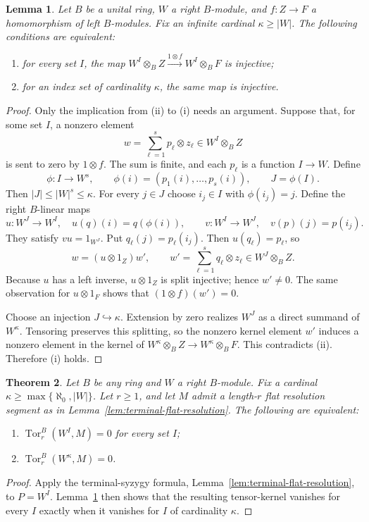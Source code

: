 \documentclass[11pt]{article}
\numberwithin{equation}{section}
\newtheorem{theorem}{Theorem}[section]
\newtheorem{lemma}[theorem]{Lemma}
\theoremstyle{definition}
\theoremstyle{remark}
\newcommand{\Tor}{\operatorname{Tor}}
\begin{document}
\begin{lemma}
\label{lem:coordinate-detection}
Let $B$ be a unital ring, $W$ a right $B$-module, and
$f:Z\to F$ a homomorphism of left $B$-modules.
Fix an infinite cardinal $\kappa\ge |W|$.  The following conditions
are equivalent:
\begin{enumerate}[label=(\roman*)]
\item for every set $I$, the map
$W^I\otimes_B Z\xrightarrow{1\otimes f}W^I\otimes_B F$
is injective;
\item for an index set of cardinality $\kappa$, the same map is injective.
\end{enumerate}
\end{lemma}
\begin{proof}
Only the implication from (ii) to (i) needs an argument.
Suppose that, for some set $I$, a nonzero element
\[
 w=\sum_{\ell=1}^{s}p_\ell\otimes z_\ell
 \in W^I\otimes_B Z
\]
is sent to zero by $1\otimes f$.  The sum is finite, and each
$p_\ell$ is a function $I\to W$.  Define
\[
\phi:I\to W^s,\qquad
\phi(i)=(p_1(i),\ldots,p_s(i)),\qquad
J=\phi(I).
\]
Then $|J|\le |W|^s\le\kappa$.  For every $j\in J$ choose
$i_j\in I$ with $\phi(i_j)=j$.  Define the right $B$-linear maps
\[
 u:W^J\to W^I,\quad u(q)(i)=q(\phi(i)),
 \qquad
 v:W^I\to W^J,\quad v(p)(j)=p(i_j).
\]
They satisfy $vu=1_{W^J}$.  Put $q_\ell(j)=p_\ell(i_j)$.
Then $u(q_\ell)=p_\ell$, so
\[
 w=(u\otimes1_Z)w',\qquad
 w'=\sum_{\ell=1}^s q_\ell\otimes z_\ell
 \in W^J\otimes_B Z.
\]
Because $u$ has a left inverse, $u\otimes1_Z$ is split
injective; hence $w'\ne0$.  The same observation for
$u\otimes1_F$ shows that $(1\otimes f)(w')=0$.

Choose an injection $J\hookrightarrow\kappa$.  Extension by zero
realizes $W^J$ as a direct summand of $W^\kappa$.  Tensoring
preserves this splitting, so the nonzero kernel element $w'$
induces a nonzero element in the kernel of
$W^\kappa\otimes_B Z\to W^\kappa\otimes_B F$.
This contradicts (ii).  Therefore (i) holds.
\end{proof}

\begin{theorem}\label{thm:one-product-top-Tor}
Let $B$ be any ring and $W$ a right $B$-module.  Fix a cardinal
$\kappa\ge\max\{\aleph_0,|W|\}$.  Let $r\ge1$, and let $M$ admit a
length-$r$ flat resolution segment as in
Lemma~\ref{lem:terminal-flat-resolution}.  The following are equivalent:
\begin{enumerate}[label=(\roman*)]
\item $\Tor_r^B(W^I,M)=0$ for every set $I$;
\item $\Tor_r^B(W^\kappa,M)=0$.
\end{enumerate}
\end{theorem}
\begin{proof}
Apply the terminal-syzygy formula, Lemma~\ref{lem:terminal-flat-resolution},
to $P=W^I$.  Lemma~\ref{lem:coordinate-detection} then shows that the
resulting tensor-kernel vanishes for every $I$ exactly when it
vanishes for $I$ of cardinality $\kappa$.
\end{proof}
\end{document}
